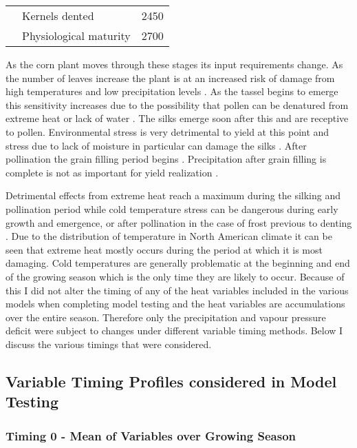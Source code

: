 \begin{table}[!htbp]
\begin{tabular}{lll}
             & Kernels dented                                                                                   & 2450 \\
             & Physiological maturity                                                                           & 2700\\
\hline
\end{tabular}
\end{table}


As the corn plant moves through these stages its input requirements change. As the number of leaves increase the plant is at an increased risk of damage from high temperatures and low precipitation levels \citep{neild1987growing}. As the tassel begins to emerge this sensitivity increases due to the possibility that pollen can be denatured from extreme heat or lack of water \citep{OMAFRA}. The silks emerge soon after this and are receptive to pollen. Environmental stress is very detrimental to yield at this point and stress due to lack of moisture in particular can damage the silks \citep{OMAFRA}. After pollination the grain filling period begins \citep{neild1987growing}. Precipitation after grain filling is complete is not as important for yield realization \citep{neild1987growing}. 

Detrimental effects from extreme heat reach a maximum during the silking and pollination period while cold temperature stress can be dangerous during early growth and emergence, or after pollination in the case of frost previous to denting \citep{OMAFRA}. Due to the distribution of temperature in North American climate it can be seen that extreme heat mostly occurs during the period at which it is most damaging. Cold temperatures are generally problematic at the beginning and end of the growing season which is the only time they are likely to occur. Because of this I did not alter the timing of any of the heat variables included in the various models when completing model testing and the heat variables are accumulations over the entire season. Therefore only the precipitation and vapour pressure deficit were subject to changes under different variable timing methods. Below I discuss the various timings that were considered.

\subsection{Variable Timing Profiles considered in Model Testing}

\subsubsection{Timing 0 - Mean of Variables over Growing Season}

